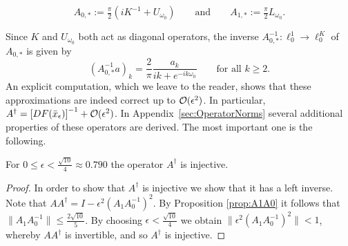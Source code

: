 \begin{definition}
\begin{equation*}
A_{0,*} 	 := \tfrac{\pi}{2} ( i K^{-1} + U_{\omega_0}) 
\qquad\text{and}\qquad
A_{1,*} 	:= \tfrac{\pi}{2} L_{\omega_0} .
\end{equation*}
\end{definition}

Since $K$ and $U_{\omega_0}$ both act as diagonal operators, the inverse 
$A_{0,*}^{-1} : \ell^1_0 \to \ell^K_0$ of $A_{0,*}$ is given by
\begin{equation*}
	  (A_{0,*}^{-1} a)_k = \frac{2}{\pi} \frac{a_k}{ik+e^{-ik\omega_0}} 
	  \qquad\text{for all } k \geq 2.
\end{equation*} 
An explicit computation, which we leave to the reader, shows that these approximations are indeed correct up to $\mathcal{O}(\epsilon^2)$. 
In particular, $A^{\dagger} = \left[ DF( \bar{x}_\epsilon ) \right]^{-1} + \mathcal{O}(\epsilon^2)$.
In Appendix~\ref{sec:OperatorNorms} several additional properties of these operators are derived. The most important one is the following.
\begin{proposition}
	\label{prop:Injective}
	For 
	$0 \leq \epsilon < \tfrac{\sqrt{10}}{4} \approx 0.790$
	 the operator $ A^{\dagger}$ is injective. 
\end{proposition}
\begin{proof}
	In order to show that $ A^{\dagger}$ is injective we show that 
	it has a left inverse. 
	Note that $ A A^{\dagger} = I - \epsilon^2 ( A_1 A_0^{-1})^2$. 
	By Proposition \ref{prop:A1A0} it follows that 
	 $ \| A_1 A_0^{-1} \| \leq \tfrac{2 \sqrt{10}}{5} $.  
	By choosing 
$ \epsilon < \tfrac{\sqrt{10}}{4}$ 
we obtain 
	$\|  \epsilon^2 ( A_1 A_0^{-1})^2 \| < 1$, whereby $ A A^{\dagger}$ is 
	invertible, and so $ A^{\dagger}$ is injective. 
\end{proof}


